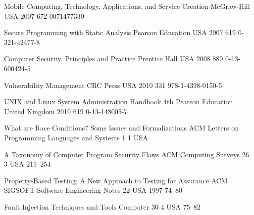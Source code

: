 \begin{thebibliography}{9}
		{
			\biband
			}
		{Mobile Computing. Technology, Applications, and Service Creation}
		{}
		{McGraw-Hill}
		{USA}
		{2007}
		{672}
		{0071477330}
	
		{}
		{Secure Programming with Static Analysis}
		{}
		{Pearson Education}
		{USA}
		{2007}
		{619}
		{0-321-42477-8}
	
		{
			\biband
			}
		{Computer Security. Principles and Practice}
		{}
		{Prentice Hall}
		{USA}
		{2008}
		{880}
		{0-13-600424-5}
	
		{}
		{Vulnerability Management}
		{}
		{CRC Press}
		{USA}
		{2010}
		{331}
		{978-1-4398-0150-5}
	
		{
			\biband
			\biband
			\biband
			}
		{{UNIX} and {L}inux System Administration Handbook}
		{4th}
		{Pearson Education}
		{United Kingdom}
		{2010}
		{619}
		{0-13-148005-7}
		

		{
			\biband
			}
		{What are Race Conditions? Some Issues and Formalizations}
		{ACM Letters on Programming Languages and Systems}
		{1}
		{1}
		{USA}
		{}
		{}
	
		{
			\biband
			\biband
			\biband
			}
		{A Taxonomy of Computer Program Security Flaws}
		{ACM Computing Surveys}
		{26}
		{3}
		{USA}
		{}
		{211--254}
		
		{
			\biband
			}
		{Property-Based Testing; A New Approach to Testing for Assurance}
		{ACM SIGSOFT Software Engineering Notes}
		{22}
		{}
		{USA}
		{1997}
		{74--80}
	
		{
			\biband
			\biband
			}
		{Fault Injection Techniques and Tools}
		{Computer}
		{30}
		{4}
		{USA}
		{}
		{75--82}
	

\end{thebibliography}
